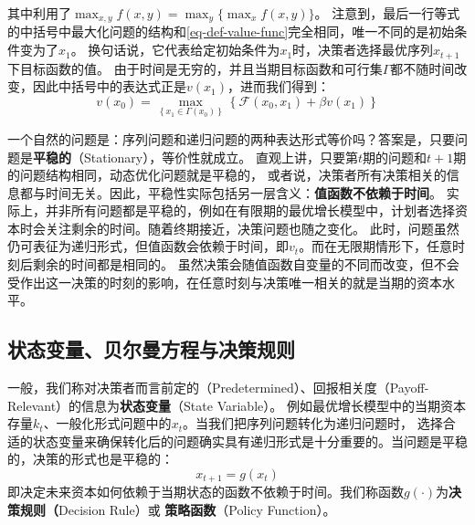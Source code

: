 其中利用了$\max_{x,y}f(x,y) = \max_{y}\{\max_{x}f(x,y)\}$。
注意到，最后一行等式的中括号中最大化问题的结构和\cref{eq-def-value-func}完全相同，唯一不同的是初始条件变为了$x_1$。
换句话说，它代表给定初始条件为$x_1$时，决策者选择最优序列$x_{t+1}$下目标函数的值。
由于时间是无穷的，并且当期目标函数和可行集$\Gamma$都不随时间改变，因此中括号中的表达式正是$v(x_1)$，进而我们得到：
\begin{equation*}
    v\left(x_0\right) = 
        \max _{\left\{x_1 \in \Gamma\left(x_0\right)\right\}}\left\{\mathcal{F}\left(x_0, x_1\right) + 
            \beta v\left(x_1\right)\right\}
\end{equation*}

一个自然的问题是：序列问题和递归问题的两种表达形式等价吗？答案是，只要问题是\textbf{平稳的}（Stationary），等价性就成立。
直观上讲，只要第$t$期的问题和$t+1$期的问题结构相同，动态优化问题就是平稳的，
或者说，决策者所有决策相关的信息都与时间无关。因此，平稳性实际包括另一层含义：\textbf{值函数不依赖于时间}。
实际上，并非所有问题都是平稳的，例如在有限期的最优增长模型中，计划者选择资本时会关注剩余的时间。随着终期接近，决策问题也随之变化。
此时，问题虽然仍可表征为递归形式，但值函数会依赖于时间，即$v_t$。而在无限期情形下，任意时刻后剩余的时间都是相同的。
虽然决策会随值函数自变量的不同而改变，但不会受作出这一决策的时刻的影响，在任意时刻与决策唯一相关的就是当期的资本水平。


\subsection{状态变量、贝尔曼方程与决策规则}

一般，我们称对决策者而言前定的（Predetermined）、回报相关度（Payoff-Relevant）的信息为\textbf{状态变量}（State Variable）。
例如最优增长模型中的当期资本存量$k_t$、一般化形式问题中的$x_t$。当我们把序列问题转化为递归问题时，
选择合适的状态变量来确保转化后的问题确实具有递归形式是十分重要的。当问题是平稳的，决策的形式也是平稳的：
\begin{equation*}
    x_{t+1} = g(x_t)
\end{equation*}
即决定未来资本如何依赖于当期状态的函数不依赖于时间。我们称函数$g(\cdot)$为\textbf{决策规则（}Decision Rule）或
\textbf{策略函数}（Policy Function）。

